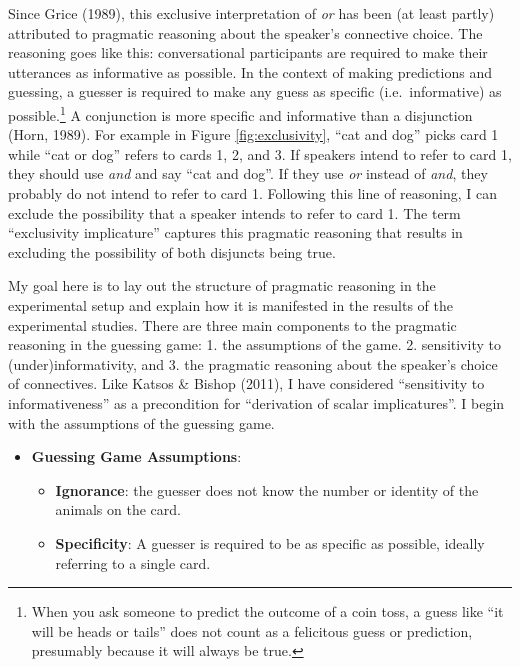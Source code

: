 \documentclass[man]{apa6}
\providecommand{\tightlist}{%
  \setlength{\itemsep}{0pt}\setlength{\parskip}{0pt}}
\theoremstyle{definition}
\theoremstyle{definition}
\theoremstyle{definition}
\theoremstyle{remark}
\begin{document}
Since Grice (1989), this exclusive interpretation of \emph{or} has been
(at least partly) attributed to pragmatic reasoning about the speaker's
connective choice. The reasoning goes like this: conversational
participants are required to make their utterances as informative as
possible. In the context of making predictions and guessing, a guesser
is required to make any guess as specific (i.e.~informative) as
possible.\footnote{When you ask someone to predict the outcome of a coin
  toss, a guess like \enquote{it will be heads or tails} does not count
  as a felicitous guess or prediction, presumably because it will always
  be true.} A conjunction is more specific and informative than a
disjunction (Horn, 1989). For example in Figure \ref{fig:exclusivity},
\enquote{cat and dog} picks card 1 while \enquote{cat or dog} refers to
cards 1, 2, and 3. If speakers intend to refer to card 1, they should
use \emph{and} and say \enquote{cat and dog}. If they use \emph{or}
instead of \emph{and}, they probably do not intend to refer to card 1.
Following this line of reasoning, I can exclude the possibility that a
speaker intends to refer to card 1. The term \enquote{exclusivity
implicature} captures this pragmatic reasoning that results in excluding
the possibility of both disjuncts being true.

My goal here is to lay out the structure of pragmatic reasoning in the
experimental setup and explain how it is manifested in the results of
the experimental studies. There are three main components to the
pragmatic reasoning in the guessing game: 1. the assumptions of the
game. 2. sensitivity to (under)informativity, and 3. the pragmatic
reasoning about the speaker's choice of connectives. Like Katsos \&
Bishop (2011), I have considered \enquote{sensitivity to
informativeness} as a precondition for \enquote{derivation of scalar
implicatures}. I begin with the assumptions of the guessing game.

\begin{itemize}
\tightlist
\item
  \textbf{Guessing Game Assumptions}:

  \begin{itemize}
  \tightlist
  \item
    \textbf{Ignorance}: the guesser does not know the number or identity
    of the animals on the card.
  \item
    \textbf{Specificity}: A guesser is required to be as specific as
    possible, ideally referring to a single card.
  \end{itemize}
\end{itemize}
\end{document}
